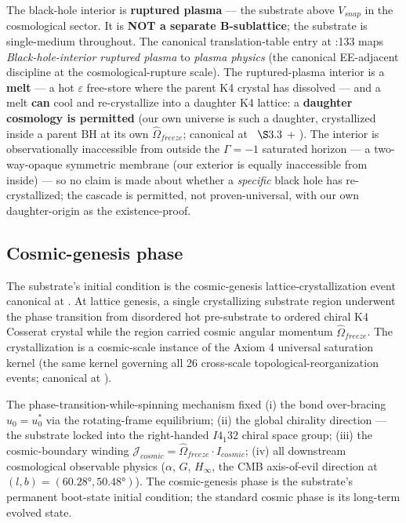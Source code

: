 The black-hole interior is \textbf{ruptured plasma} --- the substrate above $V_{snap}$ in the cosmological sector. It is \textbf{NOT a separate B-sublattice}; the substrate is single-medium throughout. The canonical translation-table entry at :133 maps \emph{Black-hole-interior ruptured plasma} to \emph{plasma physics} (the canonical EE-adjacent discipline at the cosmological-rupture scale). The ruptured-plasma interior is a \textbf{melt} --- a hot $\varepsilon$ free-store where the parent K4 crystal has dissolved --- and a melt \textbf{can} cool and re-crystallize into a daughter K4 lattice: a \textbf{daughter cosmology is permitted} (our own universe is such a daughter, crystallized inside a parent BH at its own $\hat{\Omega}_{freeze}$; canonical at ~$\S3.3$ + ). The interior is observationally inaccessible from outside the $\Gamma = -1$\gammaundeclared{} saturated horizon --- a two-way-opaque symmetric membrane (our exterior is equally inaccessible from inside) --- so no claim is made about whether a \emph{specific} black hole has re-crystallized; the cascade is permitted, not proven-universal, with our own daughter-origin as the existence-proof.

\subsection{Cosmic-genesis phase}
\label{subsec:vol9_phase_genesis}

The substrate's initial condition is the cosmic-genesis lattice-crystallization event canonical at . At lattice genesis, a single crystallizing substrate region underwent the phase transition from disordered hot pre-substrate to ordered chiral K4 Cosserat crystal while the region carried cosmic angular momentum $\hat{\Omega}_{freeze}$. The crystallization is a cosmic-scale instance of the Axiom 4 universal saturation kernel (the same kernel governing all 26 cross-scale topological-reorganization events; canonical at ).

The phase-transition-while-spinning mechanism fixed (i) the bond over-bracing $u_0 = u_0^*$ via the rotating-frame equilibrium; (ii) the global chirality direction --- the substrate locked into the right-handed $I4_1 32$ chiral space group; (iii) the cosmic-boundary winding $\mathcal{J}_{cosmic} = \hat{\Omega}_{freeze} \cdot I_{cosmic}$; (iv) all downstream cosmological observable physics ($\alpha$, $G$, $H_\infty$, the CMB axis-of-evil direction at $(l, b) = (60.28°, 50.48°)$). The cosmic-genesis phase is the substrate's permanent boot-state initial condition; the standard cosmic phase is its long-term evolved state.

